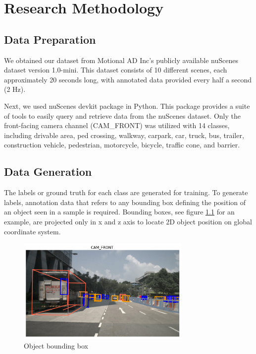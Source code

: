 \chapter{Research Methodology}

\section{Data Preparation}

We obtained our dataset from Motional AD Inc's publicly available nuScenes dataset version 1.0-mini. This dataset consists of 10 different scenes,
each approximately 20 seconds long, with annotated data provided every half a second (2 Hz).

Next, we used nuScenes devkit package in Python. This package provides a suite of tools to 
easily query and retrieve data from the nuScenes dataset. Only the front-facing camera channel (CAM\_FRONT) was utilized
with 14 classes, including drivable area, ped crossing, walkway, carpark, car, truck, bus, trailer, construction vehicle, pedestrian, motorcycle, bicycle, traffic cone, and barrier.


\section{Data Generation}
The labels or ground truth for each class are generated for training.
To generate labels, annotation data that refers to any bounding box defining the position of an object seen in a sample is required. Bounding boxes, see figure \ref{fig:BoundingBox} for an example, are projected only in x and z axis to locate 2D object position on global coordinate system.


\begin{figure}[H]
  \centering
  \includegraphics[width=0.75\textwidth]{img/3-bounding-box.png}
  \caption{Object bounding box}
  \label{fig:BoundingBox}
\end{figure}

